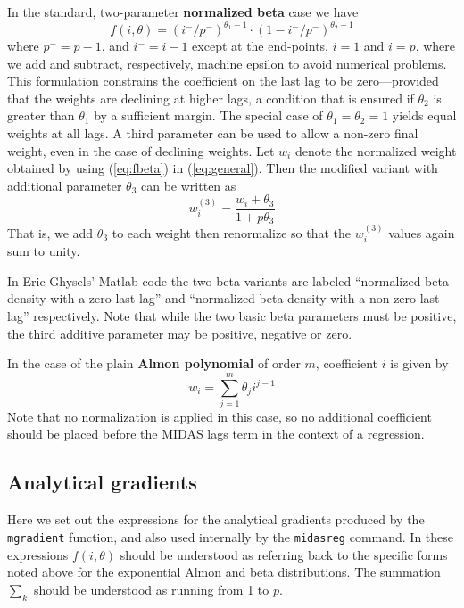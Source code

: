 \documentclass{article}
\begin{document}
In the standard, two-parameter \textbf{normalized beta} case we have
\begin{equation}
\label{eq:fbeta}
  f(i, \theta) = (i^-/p^-)^{\theta_1-1} \cdot (1-i^-/p^-)^{\theta_2-1}
\end{equation}
where $p^- = p-1$, and $i^- = i-1$ except at the end-points, $i=1$ and
$i=p$, where we add and subtract, respectively, machine epsilon to
avoid numerical problems.  This formulation constrains the coefficient
on the last lag to be zero---provided that the weights are declining
at higher lags, a condition that is ensured if $\theta_2$ is greater
than $\theta_1$ by a sufficient margin. The special case of
$\theta_1 = \theta_2 = 1$ yields equal weights at all lags. A third
parameter can be used to allow a non-zero final weight, even in the
case of declining weights.  Let $w_i$ denote the normalized weight
obtained by using (\ref{eq:fbeta}) in (\ref{eq:general}). Then the
modified variant with additional parameter $\theta_3$ can be written
as
\[
w^{(3)}_i = \frac{w_i + \theta_3}{1 + p\theta_3}
\]
That is, we add $\theta_3$ to each weight then renormalize so that the
$w^{(3)}_i$ values again sum to unity.

In Eric Ghysels' Matlab code the two beta variants are labeled
``normalized beta density with a zero last lag'' and ``normalized beta
density with a non-zero last lag'' respectively.  Note that while the
two basic beta parameters must be positive, the third additive
parameter may be positive, negative or zero.

\vspace{1ex}

In the case of the plain \textbf{Almon polynomial} of order $m$,
coefficient $i$ is given by
\[
w_i = \sum_{j=1}^m \theta_j i^{j-1}
\]
Note that no normalization is applied in this case, so no additional
coefficient should be placed before the MIDAS lags term in the context
of a regression.

\subsection*{Analytical gradients}

Here we set out the expressions for the analytical gradients produced
by the \texttt{mgradient} function, and also used internally by the
\texttt{midasreg} command. In these expressions $f(i,\theta)$ should
be understood as referring back to the specific forms noted above
for the exponential Almon and beta distributions. The summation
$\sum_k$ should be understood as running from 1 to $p$.
\end{document}
